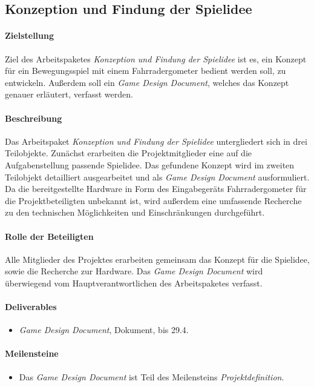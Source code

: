\subsection{Konzeption und Findung der Spielidee}
\label{ap2}

\paragraph{Zielstellung}\noindent
Ziel des Arbeitspaketes \textit{Konzeption und Findung der Spielidee} ist es, ein Konzept für ein Bewegungsspiel mit einem Fahrradergometer bedient werden soll, zu entwickeln. Außerdem soll ein \textit{Game Design Document}, welches das Konzept genauer erläutert, verfasst werden.

\paragraph{Beschreibung}\noindent
Das Arbeitspaket \textit{Konzeption und Findung der Spielidee} untergliedert sich in drei Teilobjekte. Zunächst erarbeiten die Projektmitglieder eine auf die Aufgabenstellung passende Spielidee. Das gefundene Konzept wird im zweiten Teilobjekt detailliert ausgearbeitet und als \textit{Game Design Document} ausformuliert. Da die bereitgestellte Hardware in Form des Eingabegeräts Fahrradergometer für die Projektbeteiligten unbekannt ist, wird außerdem eine umfassende Recherche zu den technischen Möglichkeiten und Einschränkungen durchgeführt. 

\paragraph{Rolle der Beteiligten}\noindent
Alle Mitglieder des Projektes erarbeiten gemeinsam das Konzept für die Spielidee, sowie die Recherche zur Hardware. Das \textit{Game Design Document} wird überwiegend vom Hauptverantwortlichen des Arbeitspaketes verfasst.

\paragraph{Deliverables}\noindent
\begin{itemize}
\item \textit{Game Design Document}, Dokument, bis 29.4.
\end{itemize}

\paragraph{Meilensteine}\noindent
\begin{itemize}
\item Das \textit{Game Design Document} ist Teil des Meilensteins \textit{Projektdefinition}.
\end{itemize}